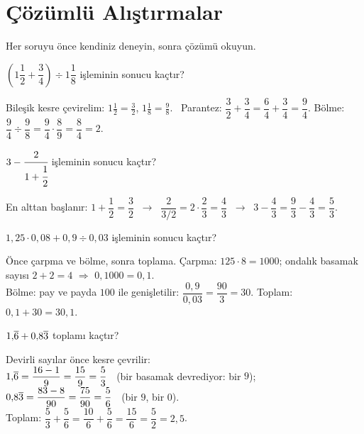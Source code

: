 \section{Çözümlü Alıştırmalar}
Her soruyu önce kendiniz deneyin, sonra çözümü okuyun.

\begin{alistirma}
\(\left(1\dfrac{1}{2}+\dfrac{3}{4}\right)\div 1\dfrac{1}{8}\) işleminin sonucu kaçtır?
\end{alistirma}
\begin{cozum}
Bileşik kesre çevirelim: \(1\frac{1}{2}=\frac{3}{2}\), \(1\frac{1}{8}=\frac{9}{8}\). \ Parantez: \(\dfrac{3}{2}+\dfrac{3}{4}=\dfrac{6}{4}+\dfrac{3}{4}=\dfrac{9}{4}\). \quad Bölme: \(\dfrac{9}{4}\div\dfrac{9}{8}=\dfrac{9}{4}\cdot\dfrac{8}{9}=\dfrac{8}{4}=2\).
\end{cozum}

\begin{alistirma}
\(3-\cfrac{2}{1+\cfrac{1}{2}}\) işleminin sonucu kaçtır?
\end{alistirma}
\begin{cozum}
En alttan başlanır: \(1+\dfrac{1}{2}=\dfrac{3}{2}\) \(\ \rightarrow\ \) \(\dfrac{2}{3/2}=2\cdot\dfrac{2}{3}=\dfrac{4}{3}\) \(\ \rightarrow\ \) \(3-\dfrac{4}{3}=\dfrac{9}{3}-\dfrac{4}{3}=\dfrac{5}{3}\).
\end{cozum}

\begin{alistirma}
\(1{,}25\cdot 0{,}08+0{,}9\div 0{,}03\) işleminin sonucu kaçtır?
\end{alistirma}
\begin{cozum}
Önce çarpma ve bölme, sonra toplama. Çarpma: \(125\cdot 8=1000\); ondalık basamak sayısı \(2+2=4\) \(\Rightarrow\) \(0{,}1000=0{,}1\).\\
Bölme: pay ve payda \(100\) ile genişletilir: \(\dfrac{0{,}9}{0{,}03}=\dfrac{90}{3}=30\). \quad Toplam: \(0{,}1+30=30{,}1\).
\end{cozum}

\begin{alistirma}
\(1{,}\overline{6}+0{,}8\overline{3}\) toplamı kaçtır?
\end{alistirma}
\begin{cozum}
Devirli sayılar önce kesre çevrilir:\\
\(1{,}\overline{6}=\dfrac{16-1}{9}=\dfrac{15}{9}=\dfrac{5}{3}\) \ (bir basamak devrediyor: bir \(9\)); \quad
\(0{,}8\overline{3}=\dfrac{83-8}{90}=\dfrac{75}{90}=\dfrac{5}{6}\) \ (bir \(9\), bir \(0\)).\\
Toplam: \(\dfrac{5}{3}+\dfrac{5}{6}=\dfrac{10}{6}+\dfrac{5}{6}=\dfrac{15}{6}=\dfrac{5}{2}=2{,}5\).
\end{cozum}

